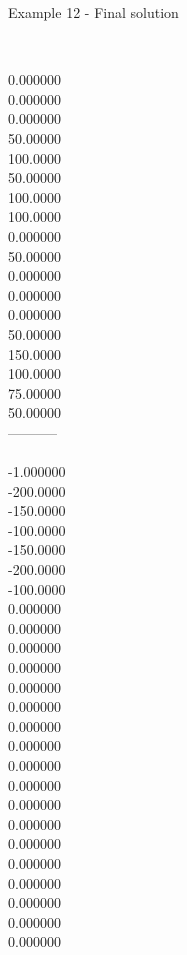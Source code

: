 \begin{frame}{Example 12 - Final solution}
\begin{columns}[t]
\begin{column}{0.3\textwidth}
\\
0.000000\\
0.000000\\
0.000000\\
50.00000\\
100.0000\\
50.00000\\
100.0000\\
100.0000\\
0.000000\\
50.00000\\
0.000000\\
0.000000\\
0.000000\\
50.00000\\
150.0000\\
100.0000\\
75.00000\\
50.00000\\

-----------\\
\\
-1.000000\\
-200.0000\\
-150.0000\\
-100.0000\\
-150.0000\\
-200.0000\\
-100.0000\\
0.000000\\
0.000000\\
0.000000\\
0.000000\\
0.000000\\
0.000000\\
0.000000\\
0.000000\\
0.000000\\
0.000000\\
0.000000\\
0.000000\\
0.000000\\
0.000000\\
0.000000\\
0.000000\\
0.000000\\
0.000000\\

\end{column}
\end{columns}  
\end{frame}

